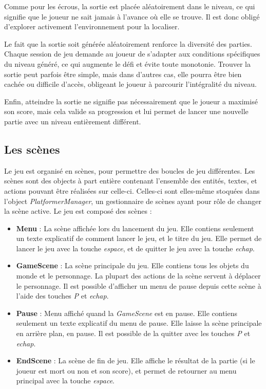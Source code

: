 \documentclass[10pt]{report}
\begin{document}
Comme pour les écrous, la sortie est placée aléatoirement dans le niveau, ce qui signifie que le joueur ne sait
jamais à l’avance où elle se trouve.
Il est donc obligé d’explorer activement l’environnement pour la localiser.

Le fait que la sortie soit générée aléatoirement renforce la diversité des parties.
Chaque session de jeu demande au joueur de s’adapter aux conditions spécifiques du niveau généré, ce qui augmente
le défi et évite toute monotonie.
Trouver la sortie peut parfois être simple, mais dans d’autres cas, elle pourra être bien cachée ou difficile d’accès,
obligeant le joueur à parcourir l’intégralité du niveau.

Enfin, atteindre la sortie ne signifie pas nécessairement que le joueur a maximisé son score, mais cela valide
sa progression et lui permet de lancer une nouvelle partie avec un niveau entièrement différent.

\subsection{Les scènes}

Le jeu est organisé en scènes, pour permettre des boucles de jeu différentes.
Les scènes sont des objects à part entière contenant l'ensemble des entités, textes, et actions pouvant être réalisées sur celle-ci.
Celles-ci sont elles-même stoquées dans l'object \emph{PlatformerManager}, un gestionnaire de scènes ayant pour rôle de changer la scène active.
Le jeu est composé des scènes :\\
\begin{itemize}
  \item \textbf{Menu} : La scène affichée lors du lancement du jeu. Elle contiens seulement un texte explicatif de comment lancer le jeu, et le titre du jeu.
  Elle permet de lancer le jeu avec la touche \emph{espace}, et de quitter le jeu avec la touche \emph{echap}.
  \item \textbf{GameScene} : La scène principale du jeu. Elle contiens tous les objets du monde et le personnage. La plupart des actions de la scène servent à déplacer le personnage.
  Il est possible d'afficher un menu de pause depuis cette scène à l'aide des touches \emph{P} et \emph{echap}.
  \item \textbf{Pause} : Menu affiché quand la \emph{GameScene} est en pause. Elle contiens seulement un texte explicatif du menu de pause.
  Elle laisse la scène principale en arrière plan, en pause. Il est possible de la quitter avec les touches \emph{P} et \emph{echap}.
  \item \textbf{EndScene} : La scène de fin de jeu.
  Elle affiche le résultat de la partie (si le joueur est mort ou non et son score), et permet de retourner au menu principal avec la touche \emph{espace}.
\end{itemize}
\end{document}
